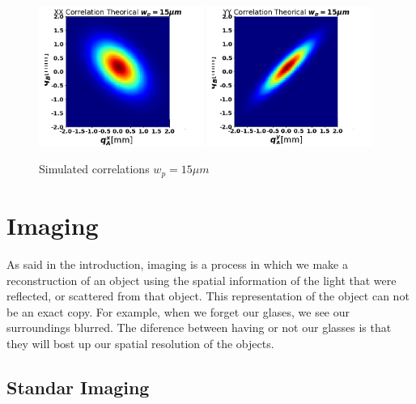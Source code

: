 \begin{figure}[h!]
\centering
{  \includegraphics[width=0.48\textwidth]{Figures/correlationsWaistxx15.png} }
{  \includegraphics[width=0.48\textwidth]{Figures/correlationsWaistyy15.png} }
\caption{Simulated correlations $w_p=15\mu m$ }
 \label{fig:simCorrelations}
\end{figure}


\section{Imaging}
  
As said in the introduction, imaging is a process in which we make a reconstruction 
of an object using the spatial information of the light that were reflected, or scattered
from that object. This representation of the object can not be an exact copy. For example, when we forget
our glases, we see our surroundings blurred. The diference between 
having or not our glasses is that they will bost up our spatial resolution of the objects.



\subsection{Standar Imaging}


